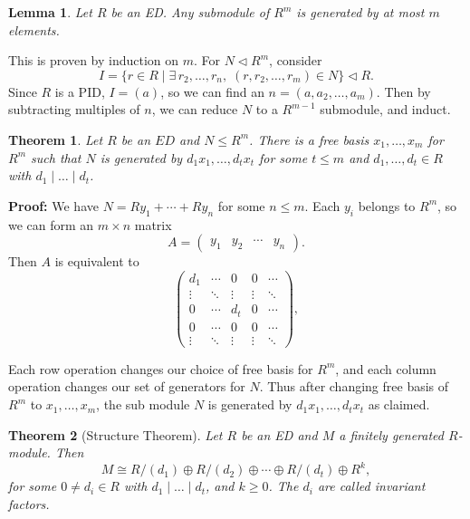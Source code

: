 \documentclass[12pt]{article}
\newtheorem{theorem}{Theorem}[section]
\newtheorem{lemma}{Lemma}[section]
\theoremstyle{definition}
\theoremstyle{remark}
\begin{document}
\begin{lemma}
	Let $R$ be an ED. Any submodule of $R^{m}$ is generated by at most $m$ elements.
\end{lemma}

This is proven by induction on $m$. For $N \lhd R^{m}$, consider
\[
	I = \{r \in R \mid \exists\, r_2, \ldots, r_n, \; (r, r_2, \ldots, r_m) \in N\} \lhd R
.\]
Since $R$ is a PID, $I = (a)$, so we can find an $n = (a, a_2, \ldots, a_m)$. Then by subtracting multiples of $n$, we can reduce $N$ to a $R^{m-1}$ submodule, and induct.

\begin{theorem}
	Let $R$ be an $ED$ and $N \leq R^{m}$. There is a free basis $x_1, \ldots, x_m$ for $R^{m}$ such that $N$ is generated by $d_1x_1, \ldots, d_tx_t$ for some $t \leq m$ and $d_1, \ldots, d_t \in R$ with $d_1 \mid \ldots \mid d_t$.
\end{theorem}

\begin{adjustbox}{minipage = \columnwidth - 25.5pt, margin=1em, frame=1pt, margin=0em}
\textbf{Proof:} We have $N = Ry_1 + \cdots + Ry_n$ for some $n \leq m$. Each $y_i$ belongs to $R^{m}$, so we can form an $m \times n$ matrix
\[
	A =
	\begin{pmatrix}
		y_1 & y_2 & \cdots & y_n
	\end{pmatrix}
.\]
Then $A$ is equivalent to 
\[
	\begin{pmatrix}
		d_1 & \cdots & 0 & 0 & \cdots \\
		\vdots & \ddots & \vdots & \vdots & \ddots \\
		0 & \cdots & d_t & 0 & \cdots \\
		0 & \cdots & 0 & 0 & \cdots \\
		\vdots & \ddots & \vdots & \vdots & \ddots
	\end{pmatrix}
,\]

\end{adjustbox}

\begin{adjustbox}{minipage = \columnwidth - 25.5pt, margin=1em, frame=1pt, margin=0em}
Each row operation changes our choice of free basis for $R^{m}$, and each column operation changes our set of generators for $N$. Thus after changing free basis of $R^{m}$ to $x_1, \ldots, x_m$, the sub module $N$ is generated by $d_1x_1, \ldots, d_tx_t$ as claimed.
\end{adjustbox}

\begin{theorem}[Structure Theorem]
	Let $R$ be an ED and $M$ a finitely generated $R$-module. Then
	\[
		M \cong R/(d_1) \oplus R/(d_2) \oplus \cdots \oplus R/(d_t) \oplus R^{k}
	,\]
	for some $0 \neq d_i \in R$ with $d_1 \mid \ldots \mid d_t$, and $k \geq 0$. The $d_i$ are called invariant factors.
\end{theorem}
\end{document}
